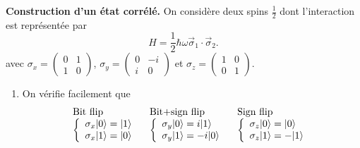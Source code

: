 \begin{example}
\textbf{Construction d'un état corrélé.} On considère deux spins $\frac{1}{2}$
dont l'interaction est représentée par%
\begin{equation}
H=\frac{1}{2}\hbar\omega\vec{\sigma}_{1}\cdot\vec{\sigma}_{2}.
\end{equation}
avec $\sigma_{x}=\begin{pmatrix}
0 & 1\\
1 & 0
\end{pmatrix}$, $\sigma_{y}=\begin{pmatrix}
0 & -i\\
i & 0
\end{pmatrix}$ et $\sigma_{z}=\begin{pmatrix}
1 & 0\\
0 & 1
\end{pmatrix}$.

\begin{enumerate}
\item On vérifie facilement que
\begin{equation}%
\begin{tabular}
[c]{lll}%
Bit flip & Bit+sign flip & Sign flip\\
$\left\{
  \begin{array}
  [c]{l}%
  \sigma_{x}\ket{0}=\ket{1} \\
  \sigma_{x}\ket{1} =\ket{0}
  \end{array}
  \right.  $ & $\left\{
    \begin{array}
    [c]{l}%
    \sigma_{y}\ket{0}=i\ket{1} \\
    \sigma_{y}\ket{1} =-i\ket{0}
    \end{array}
    \right.  $ & $\left\{
      \begin{array}
      [c]{l}%
      \sigma_{z}\ket{0}=\ket{0}\\
      \sigma_{z}\ket{1} =-\ket{1}
      \end{array}
      \right. $ %
 \end{tabular}
 \end{equation}


\end{enumerate}
\end{example}
